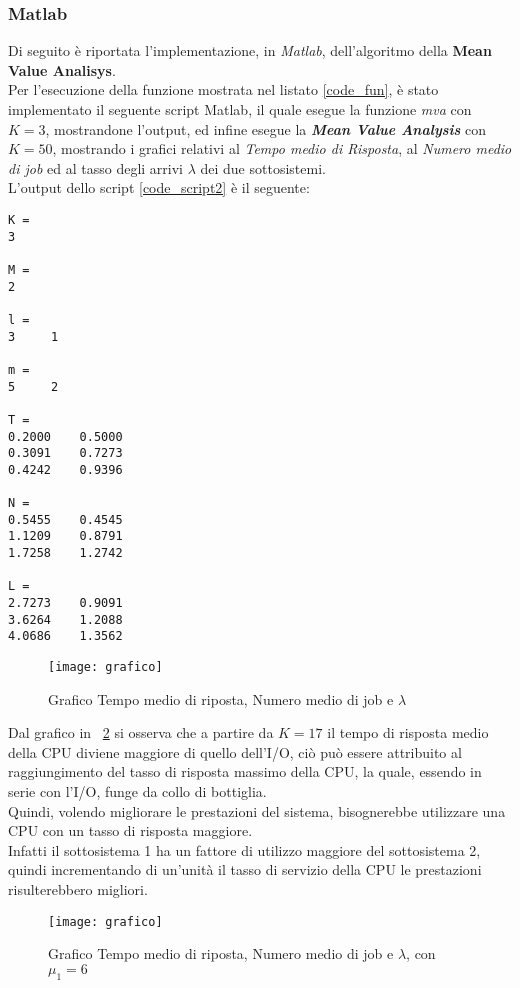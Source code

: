 \clearpage

\subsubsection{Matlab}
Di seguito è riportata l'implementazione, in \textit{Matlab}, dell'algoritmo
della \textbf{Mean Value Analisys}.\\


Per l'esecuzione della funzione mostrata nel listato \ref{code_fun}, è stato implementato
 il seguente script Matlab, il quale esegue la funzione \textit{mva} con $K=3$,
 mostrandone l'output, ed infine esegue la \textbf{\textit{Mean Value Analysis}} con
 $K=50$, mostrando i grafici relativi al \textit{Tempo medio di Risposta},
 al \textit{Numero medio di job} ed al tasso degli arrivi $\lambda$
 dei due sottosistemi.\\



\vspace{0.4cm}
L'output dello script \ref{code_script2} è il seguente:

\color{black} \begin{verbatim}
K =
3

M =
2

l =
3     1

m =
5     2

T =
0.2000    0.5000
0.3091    0.7273
0.4242    0.9396

N =
0.5455    0.4545
1.1209    0.8791
1.7258    1.2742

L =
2.7273    0.9091
3.6264    1.2088
4.0686    1.3562
\end{verbatim} \color{black}

\begin{figure}[!htbp]
  \centering
  \texttt{[image: grafico]}
  \caption{Grafico Tempo medio di riposta, Numero medio di job e $\lambda$}
  \label{code_graph1}
\end{figure}

Dal grafico in \figurename~\ref{code_graph1} si osserva che a partire da $K=17$ il
tempo di risposta medio della CPU diviene maggiore di quello dell'I/O, ciò può
essere attribuito al raggiungimento del tasso di risposta massimo della CPU,
la quale, essendo in serie con l'I/O, funge da collo di bottiglia.\\
Quindi, volendo migliorare le prestazioni del sistema, bisognerebbe utilizzare
una CPU con un tasso di risposta maggiore.\\
Infatti il sottosistema 1 ha un fattore di utilizzo maggiore del sottosistema 2,
quindi incrementando di un'unità il tasso di servizio della CPU le prestazioni
risulterebbero migliori.\\

\begin{figure}[!htbp]
  \centering
  \texttt{[image: grafico]}
  \caption{Grafico Tempo medio di riposta, Numero medio di job e $\lambda$, con $\mu_1=6$}
  \label{code_graph1}
\end{figure}
